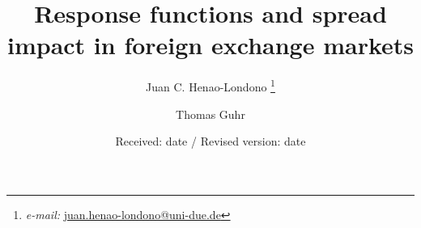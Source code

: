 \title{Response functions and spread impact in foreign exchange markets}
\author{Juan C. Henao-Londono
        \thanks{\emph{e-mail: }\href{mailto:juan.henao-londono@uni-due.de}
        {juan.henao-londono@uni-due.de}}
        \and Thomas Guhr}
\date{Received: date / Revised version: date}
